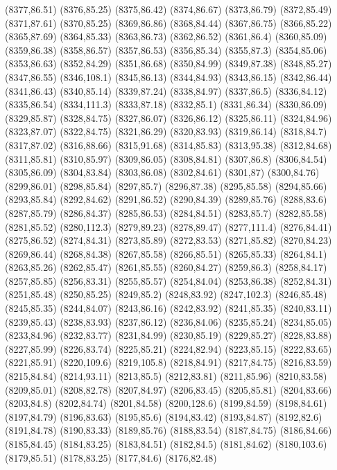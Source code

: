(8377,86.51)
(8376,85.25)
(8375,86.42)
(8374,86.67)
(8373,86.79)
(8372,85.49)
(8371,87.61)
(8370,85.25)
(8369,86.86)
(8368,84.44)
(8367,86.75)
(8366,85.22)
(8365,87.69)
(8364,85.33)
(8363,86.73)
(8362,86.52)
(8361,86.4)
(8360,85.09)
(8359,86.38)
(8358,86.57)
(8357,86.53)
(8356,85.34)
(8355,87.3)
(8354,85.06)
(8353,86.63)
(8352,84.29)
(8351,86.68)
(8350,84.99)
(8349,87.38)
(8348,85.27)
(8347,86.55)
(8346,108.1)
(8345,86.13)
(8344,84.93)
(8343,86.15)
(8342,86.44)
(8341,86.43)
(8340,85.14)
(8339,87.24)
(8338,84.97)
(8337,86.5)
(8336,84.12)
(8335,86.54)
(8334,111.3)
(8333,87.18)
(8332,85.1)
(8331,86.34)
(8330,86.09)
(8329,85.87)
(8328,84.75)
(8327,86.07)
(8326,86.12)
(8325,86.11)
(8324,84.96)
(8323,87.07)
(8322,84.75)
(8321,86.29)
(8320,83.93)
(8319,86.14)
(8318,84.7)
(8317,87.02)
(8316,88.66)
(8315,91.68)
(8314,85.83)
(8313,95.38)
(8312,84.68)
(8311,85.81)
(8310,85.97)
(8309,86.05)
(8308,84.81)
(8307,86.8)
(8306,84.54)
(8305,86.09)
(8304,83.84)
(8303,86.08)
(8302,84.61)
(8301,87)
(8300,84.76)
(8299,86.01)
(8298,85.84)
(8297,85.7)
(8296,87.38)
(8295,85.58)
(8294,85.66)
(8293,85.84)
(8292,84.62)
(8291,86.52)
(8290,84.39)
(8289,85.76)
(8288,83.6)
(8287,85.79)
(8286,84.37)
(8285,86.53)
(8284,84.51)
(8283,85.7)
(8282,85.58)
(8281,85.52)
(8280,112.3)
(8279,89.23)
(8278,89.47)
(8277,111.4)
(8276,84.41)
(8275,86.52)
(8274,84.31)
(8273,85.89)
(8272,83.53)
(8271,85.82)
(8270,84.23)
(8269,86.44)
(8268,84.38)
(8267,85.58)
(8266,85.51)
(8265,85.33)
(8264,84.1)
(8263,85.26)
(8262,85.47)
(8261,85.55)
(8260,84.27)
(8259,86.3)
(8258,84.17)
(8257,85.85)
(8256,83.31)
(8255,85.57)
(8254,84.04)
(8253,86.38)
(8252,84.31)
(8251,85.48)
(8250,85.25)
(8249,85.2)
(8248,83.92)
(8247,102.3)
(8246,85.48)
(8245,85.35)
(8244,84.07)
(8243,86.16)
(8242,83.92)
(8241,85.35)
(8240,83.11)
(8239,85.43)
(8238,83.93)
(8237,86.12)
(8236,84.06)
(8235,85.24)
(8234,85.05)
(8233,84.96)
(8232,83.77)
(8231,84.99)
(8230,85.19)
(8229,85.27)
(8228,83.88)
(8227,85.99)
(8226,83.74)
(8225,85.21)
(8224,82.94)
(8223,85.15)
(8222,83.65)
(8221,85.91)
(8220,109.6)
(8219,105.8)
(8218,84.91)
(8217,84.75)
(8216,83.59)
(8215,84.84)
(8214,93.11)
(8213,85.5)
(8212,83.81)
(8211,85.96)
(8210,83.58)
(8209,85.01)
(8208,82.78)
(8207,84.97)
(8206,83.45)
(8205,85.81)
(8204,83.66)
(8203,84.8)
(8202,84.74)
(8201,84.58)
(8200,128.6)
(8199,84.59)
(8198,84.61)
(8197,84.79)
(8196,83.63)
(8195,85.6)
(8194,83.42)
(8193,84.87)
(8192,82.6)
(8191,84.78)
(8190,83.33)
(8189,85.76)
(8188,83.54)
(8187,84.75)
(8186,84.66)
(8185,84.45)
(8184,83.25)
(8183,84.51)
(8182,84.5)
(8181,84.62)
(8180,103.6)
(8179,85.51)
(8178,83.25)
(8177,84.6)
(8176,82.48)
